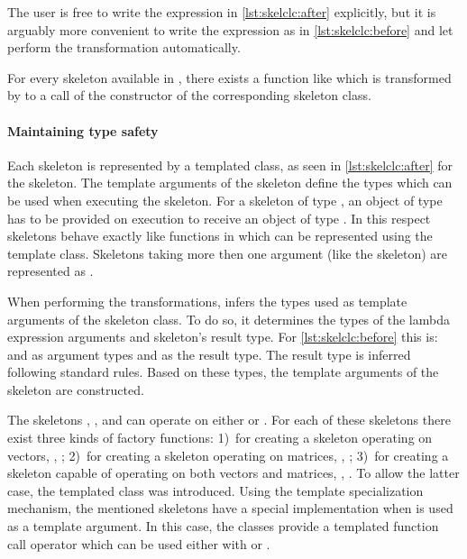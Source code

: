 The user is free to write the expression in \autoref{lst:skelclc:after} explicitly, but it is arguably more convenient to write the expression as in \autoref{lst:skelclc:before} and let  perform the transformation automatically.

For every skeleton available in \SkelCL, there exists a function like  which is transformed by  to a call of the constructor of the corresponding skeleton class.

\paragraph{Maintaining type safety}
Each skeleton is represented by a templated class, as seen in \autoref{lst:skelclc:after} for the \zip skeleton.
The template arguments of the skeleton define the types which can be used when executing the skeleton.
For a skeleton of type , an object of type  has to be provided on execution to receive an object of type .
In this respect skeletons behave exactly like functions in \Cpp which can be represented using the  template class.
Skeletons taking more then one argument (like the  skeleton) are represented as .%

When performing the transformations,  infers the types used as template arguments of the skeleton class.
To do so, it determines the types of the lambda expression arguments and skeleton's result type.
For \autoref{lst:skelclc:before} this is:  and  as argument types and  as the result type.
The result type is inferred following standard \Cpp rules.
Based on these types, the template arguments of the skeleton are constructed.

The skeletons \map, \zip, and \stencil can operate on either  or .
For each of these skeletons there exist three kinds of factory functions:
1)~for creating a skeleton operating on vectors, \eg, ;
2)~for creating a skeleton operating on matrices, \eg, ;
3)~for creating a skeleton capable of operating on both vectors and matrices, \eg, .
To allow the latter case, the templated class  was introduced.
Using the template specialization mechanism, the mentioned skeletons have a special implementation when  is used as a template argument.
In this case, the classes provide a templated function call operator which can be used either with  or .

